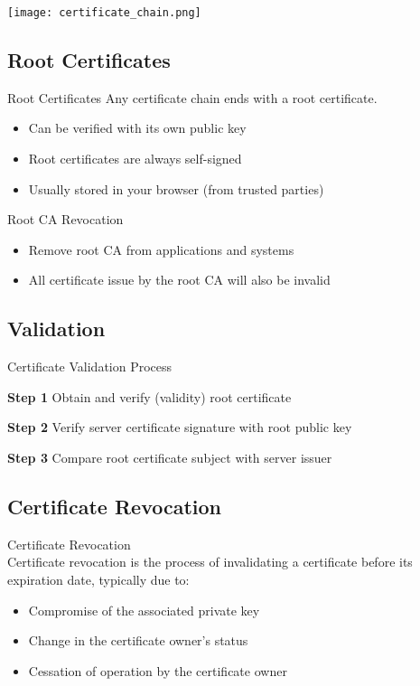 \texttt{[image: certificate\_chain.png]}




\subsection{Root Certificates}

\begin{concept}{Root Certificates}
    Any certificate chain ends with a root certificate.
    \begin{itemize}
        \item Can be verified with its own public key
        \item Root certificates are always self-signed
        \item Usually stored in your browser (from trusted parties)
    \end{itemize}
\end{concept}

\begin{concept}{Root CA Revocation}
    \begin{itemize}
        \item Remove root CA from applications and systems
        \item All certificate issue by the root CA will also be invalid
    \end{itemize}
\end{concept}

\subsection{Validation}

\begin{KR}{Certificate Validation Process}

    \textbf{Step 1} Obtain and verify (validity) root certificate

    \textbf{Step 2} Verify server certificate signature with root public key

    \textbf{Step 3} Compare root certificate subject with server issuer
\end{KR}





\subsection{Certificate Revocation}

\begin{definition}{Certificate Revocation}\\
Certificate revocation is the process of invalidating a certificate before its expiration date, typically due to:
\begin{itemize}
    \item Compromise of the associated private key
    \item Change in the certificate owner's status
    \item Cessation of operation by the certificate owner
\end{itemize}
\end{definition}


